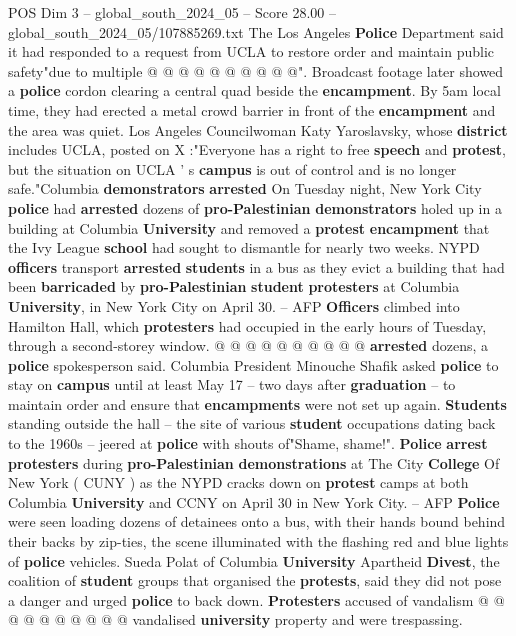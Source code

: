 \begin{textsample}{POS Dim 3 – global\_south\_2024\_05 – Score 28.00 – global\_south\_2024\_05/107885269.txt}
The Los Angeles \textbf{Police} Department said it had responded to a request from UCLA to restore order and maintain public safety"due to multiple @ @ @ @ @ @ @ @ @ @".
Broadcast footage later showed a \textbf{police} cordon clearing a central quad beside the \textbf{encampment}.
By 5am local time, they had erected a metal crowd barrier in front of the \textbf{encampment} and the area was quiet.
Los Angeles Councilwoman Katy Yaroslavsky, whose \textbf{district} includes UCLA, posted on X :"Everyone has a right to free \textbf{speech} and \textbf{protest}, but the situation on UCLA ' s \textbf{campus} is out of control and is no longer safe."Columbia \textbf{demonstrators} \textbf{arrested} On Tuesday night, New York City \textbf{police} had \textbf{arrested} dozens of \textbf{pro-Palestinian} \textbf{demonstrators} holed up in a building at Columbia \textbf{University} and removed a \textbf{protest} \textbf{encampment} that the Ivy League \textbf{school} had sought to dismantle for nearly two weeks.
NYPD \textbf{officers} transport \textbf{arrested} \textbf{students} in a bus as they evict a building that had been \textbf{barricaded} by \textbf{pro-Palestinian} \textbf{student} \textbf{protesters} at Columbia \textbf{University}, in New York City on April 30. -- AFP \textbf{Officers} climbed into Hamilton Hall, which \textbf{protesters} had occupied in the early hours of Tuesday, through a second-storey window. @ @ @ @ @ @ @ @ @ @ \textbf{arrested} dozens, a \textbf{police} spokesperson said.
Columbia President Minouche Shafik asked \textbf{police} to stay on \textbf{campus} until at least May 17 -- two days after \textbf{graduation} -- to maintain order and ensure that \textbf{encampments} were not set up again. \textbf{Students} standing outside the hall -- the site of various \textbf{student} occupations dating back to the 1960s -- jeered at \textbf{police} with shouts of"Shame, shame!". \textbf{Police} \textbf{arrest} \textbf{protesters} during \textbf{pro-Palestinian} \textbf{demonstrations} at The City \textbf{College} Of New York ( CUNY ) as the NYPD cracks down on \textbf{protest} camps at both Columbia \textbf{University} and CCNY on April 30 in New York City. -- AFP \textbf{Police} were seen loading dozens of detainees onto a bus, with their hands bound behind their backs by zip-ties, the scene illuminated with the flashing red and blue lights of \textbf{police} vehicles.
Sueda Polat of Columbia \textbf{University} Apartheid \textbf{Divest}, the coalition of \textbf{student} groups that organised the \textbf{protests}, said they did not pose a danger and urged \textbf{police} to back down. \textbf{Protesters} accused of vandalism @ @ @ @ @ @ @ @ @ @ vandalised \textbf{university} property and were trespassing.

\end{textsample}
